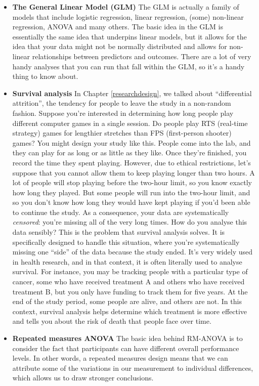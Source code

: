 \documentclass[
]{book}
\theoremstyle{definition}
\theoremstyle{definition}
\theoremstyle{definition}
\theoremstyle{definition}
\theoremstyle{remark}
\begin{document}
\begin{itemize}
\item
  \textbf{The General Linear Model (GLM)} The GLM is actually a family of models that include logistic regression, linear regression, (some) non-linear regression, ANOVA and many others. The basic idea in the GLM is essentially the same idea that underpins linear models, but it allows for the idea that your data might not be normally distributed and allows for non-linear relationships between predictors and outcomes. There are a lot of very handy analyses that you can run that fall within the GLM, so it's a handy thing to know about.
\item
  \textbf{Survival analysis} In Chapter \ref{researchdesign}, we talked about ``differential attrition'', the tendency for people to leave the study in a non-random fashion. Suppose you're interested in determining how long people play different computer games in a single session. Do people play RTS (real-time strategy) games for lengthier stretches than FPS (first-person shooter) games? You might design your study like this. People come into the lab, and they can play for as long or as little as they like. Once they're finished, you record the time they spent playing. However, due to ethical restrictions, let's suppose that you cannot allow them to keep playing longer than two hours. A lot of people will stop playing before the two-hour limit, so you know exactly how long they played. But some people will run into the two-hour limit, and so you don't know how long they would have kept playing if you'd been able to continue the study. As a consequence, your data are systematically \emph{censored}: you're missing all of the very long times. How do you analyse this data sensibly? This is the problem that survival analysis solves. It is specifically designed to handle this situation, where you're systematically missing one ``side'' of the data because the study ended. It's very widely used in health research, and in that context, it is often literally used to analyse survival. For instance, you may be tracking people with a particular type of cancer, some who have received treatment A and others who have received treatment B, but you only have funding to track them for five years. At the end of the study period, some people are alive, and others are not. In this context, survival analysis helps determine which treatment is more effective and tells you about the risk of death that people face over time.
\item
  \textbf{Repeated measures ANOVA} The basic idea behind RM-ANOVA is to consider the fact that participants can have different overall performance levels. In other words, a repeated measures design means that we can attribute some of the variations in our measurement to individual differences, which allows us to draw stronger conclusions.

\end{itemize}
\end{document}

